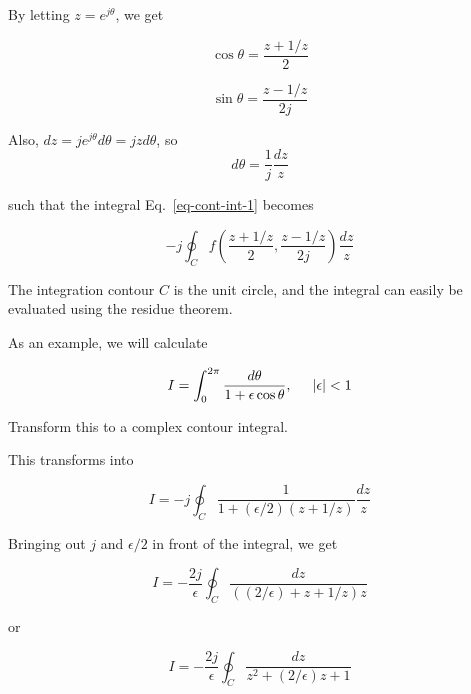 By letting $z=e^{j \theta}$, we get 

\begin{equation}
\cos \theta = \frac{z + 1/z}{2}
\end{equation} 

\begin{equation}
\sin \theta = \frac{z - 1/z}{2j}
\end{equation} 

Also, $dz = j e^{j \theta} d \theta = j z d \theta$, so
\begin{equation}
d \theta = \frac{1}{j}\frac{dz}{z}
\end{equation} 

such that the integral Eq.~\ref{eq-cont-int-1} becomes

\begin{equation}
-j \oint_{{C}} f\left(\frac{z + 1/z}{2}, \frac{z - 1/z}{2j}\right)
\frac{dz}{z}
\end{equation} 

The integration contour ${C}$ is the unit circle, and the integral can easily be evaluated using the residue theorem.

As an example, we will calculate

\begin{equation}
I = \int_0^{2 \pi} \frac{d \theta}{1 + \epsilon \cos \theta}, \hspace{0.5cm}
|\epsilon| < 1
\end{equation} 

\begin{cue}
Transform this to a complex contour integral.
\end{cue}

This transforms into

\begin{equation}
I = -j \oint_{{C}} \frac{1}{1 + (\epsilon / 2)\left(z + 1/z\right)}
\frac{dz}{z}
\end{equation} 

Bringing out $j$ and $\epsilon / {2}$ in front of the integral, we get

\begin{equation}
  I = -\frac{2j}{\epsilon} \oint_{{C}} \frac{dz}{\left((2 / \epsilon) + z +
  1/z \right) z}
\end{equation} 

or

\begin{equation}
I = -\frac{2j}{\epsilon} \oint_{{C}} \frac{dz}{z^2 + (2 / \epsilon)z +
1}
\end{equation} 

